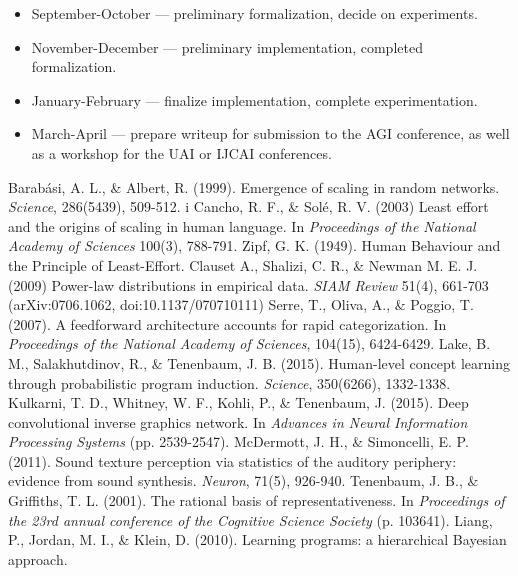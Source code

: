 \documentclass[11pt,letterpaper]{article}
\begin{document}
\begin{itemize}
  \item September-October --- preliminary formalization, decide on
    experiments.
  \item November-December --- preliminary implementation, completed
    formalization.
  \item January-February --- finalize implementation, complete
    experimentation.
  \item March-April --- prepare writeup for submission to the AGI
    conference, as well as a workshop for the UAI or IJCAI conferences.
\end{itemize}


\begin{thebibliography}{}
    Barab\'asi, A. L., \& Albert, R. (1999).
    Emergence of scaling in random networks.
    \emph{Science}, 286(5439), 509-512.
   i Cancho, R. F., \& Solé, R. V. (2003)
    Least effort and the origins of scaling in human language.
    In \emph{Proceedings of the National Academy of Sciences} 100(3), 788-791.
   Zipf, G. K. (1949).
    Human Behaviour and the Principle of Least-Effort.
   Clauset A., Shalizi, C. R., \& Newman M. E. J.  (2009)
    Power-law distributions in empirical data.
    \emph{SIAM Review} 51(4), 661-703 (arXiv:0706.1062, doi:10.1137/070710111)
    Serre, T., Oliva, A., \& Poggio, T. (2007).
    A feedforward architecture accounts for rapid categorization.
    In \emph{Proceedings of the National Academy of Sciences}, 104(15), 6424-6429.
   Lake, B. M., Salakhutdinov, R., \& Tenenbaum, J. B. (2015).
    Human-level concept learning through probabilistic program induction.
    \emph{Science}, 350(6266), 1332-1338.
    Kulkarni, T. D., Whitney, W. F., Kohli, P., \& Tenenbaum, J. (2015).
    Deep convolutional inverse graphics network.
    In \emph{Advances in Neural Information Processing Systems} (pp. 2539-2547).
    McDermott, J. H., \& Simoncelli, E. P. (2011).
    Sound texture perception via statistics of the auditory periphery:
    evidence from sound synthesis.
    \emph{Neuron}, 71(5), 926-940.
    Tenenbaum, J. B., \& Griffiths, T. L. (2001).
    The rational basis of representativeness.
    In \emph{Proceedings of the 23rd annual conference of the Cognitive
    Science Society} (p. 103641).
    Liang, P., Jordan, M. I., \& Klein, D. (2010).
    Learning programs: a hierarchical Bayesian approach.

\end{thebibliography}
\end{document}
